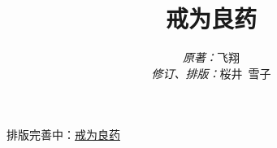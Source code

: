 \documentclass{ctexart}
\title{戒为良药}
\author{{\it 原著：}飞翔 \\ {\footnotesize {\it 修订、排版：}桜井\ 雪子}}
\date{}
\begin{document}
\maketitle

排版完善中：\href{https://github.com/ph3n92h3/notes/tree/main/%E6%88%92%E4%B8%BA%E8%89%AF%E8%8D%AF}{戒为良药}

\begin{multicols}{2}
\end{multicols}\clearpage

















































\end{document}
